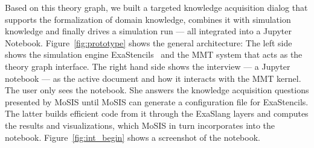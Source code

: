 Based on this theory graph, we built a targeted knowledge acquisition dialog that supports the formalization of domain knowledge, combines it with simulation knowledge and finally drives a simulation run --- all integrated into a Jupyter Notebook.
Figure~\ref{fig:prototype} shows the general architecture:
The left side shows the simulation engine \textsf{ExaStencils}~\cite{exastencils.on} and the MMT system that acts as the theory graph interface.
The right hand side shows the interview --- a Jupyter notebook --- as the active document and how it interacts with the MMT kernel.
The user only sees the notebook.
She answers the knowledge acquisition questions presented by MoSIS until MoSIS can generate a configuration file for ExaStencils.
The latter builds efficient code from it through the ExaSlang layers and computes the results and visualizations, which MoSIS in turn incorporates into the notebook. 
Figure~\ref{fig:int_begin} shows a screenshot of the notebook.


